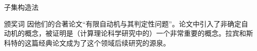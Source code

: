 \documentclass{beamer}
\begin{document}
\begin{frame}{子集构造法}
%		
\end{frame}

\begin{frame}{颁奖词}
因他们的合著论文“有限自动机与其判定性问题”。论文中引入了非确定自动机的概念，被证明是（计算理论科学研究中的）一个非常重要的概念。拉宾和斯科特的这篇经典论文成为了这个领域后续研究的源泉。
\end{frame}
\end{document}
